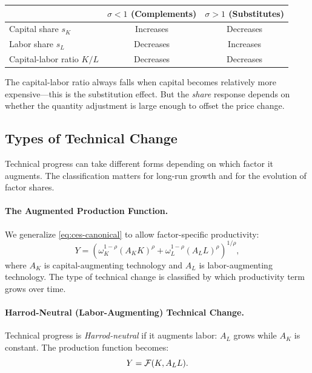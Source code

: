 \begin{center}
\renewcommand{\arraystretch}{1.3}
\begin{tabular}{@{}lcc@{}}
\toprule
& $\sigma < 1$ (Complements) & $\sigma > 1$ (Substitutes) \\
\midrule
Capital share $s_K$ & Increases & Decreases \\
Labor share $s_L$ & Decreases & Increases \\
Capital-labor ratio $K/L$ & Decreases & Decreases \\
\bottomrule
\end{tabular}
\end{center}

The capital-labor ratio always falls when capital becomes relatively more expensive---this is the substitution effect. But the \emph{share} response depends on whether the quantity adjustment is large enough to offset the price change.

\subsection{Types of Technical Change}
\label{subsec:technical-change}

Technical progress can take different forms depending on which factor it augments. The classification matters for long-run growth and for the evolution of factor shares.

\paragraph{The Augmented Production Function.}
We generalize \cref{eq:ces-canonical} to allow factor-specific productivity:
\begin{equation}
Y = \left( \omega_K^{1-\rho} (A_K K)^\rho + \omega_L^{1-\rho} (A_L L)^\rho \right)^{1/\rho},
\label{eq:augmented-ces}
\end{equation}
where $A_K$ is capital-augmenting technology and $A_L$ is labor-augmenting technology. The type of technical change is classified by which productivity term grows over time.

\paragraph{Harrod-Neutral (Labor-Augmenting) Technical Change.}
Technical progress is \emph{Harrod-neutral} if it augments labor: $A_L$ grows while $A_K$ is constant. The production function becomes:
\begin{equation}
Y = \mathcal{F}(K, A_L L).
\label{eq:harrod-neutral}
\end{equation}

